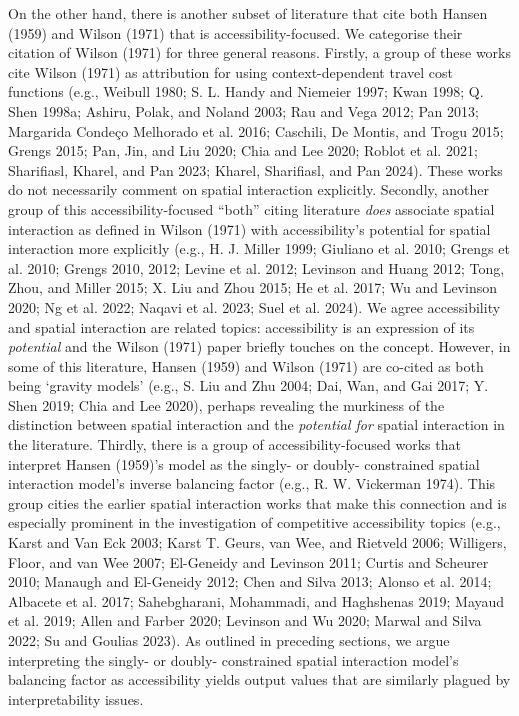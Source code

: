 \documentclass[
]{article}
\begin{document}
On the other hand, there is another subset of literature that cite both
Hansen (1959) and Wilson (1971) that is accessibility-focused. We
categorise their citation of Wilson (1971) for three general reasons.
Firstly, a group of these works cite Wilson (1971) as attribution for
using context-dependent travel cost functions (e.g., Weibull 1980; S. L.
Handy and Niemeier 1997; Kwan 1998; Q. Shen 1998a; Ashiru, Polak, and
Noland 2003; Rau and Vega 2012; Pan 2013; Margarida Condeço Melhorado et
al. 2016; Caschili, De Montis, and Trogu 2015; Grengs 2015; Pan, Jin,
and Liu 2020; Chia and Lee 2020; Roblot et al. 2021; Sharifiasl, Kharel,
and Pan 2023; Kharel, Sharifiasl, and Pan 2024). These works do not
necessarily comment on spatial interaction explicitly. Secondly, another
group of this accessibility-focused ``both'' citing literature
\emph{does} associate spatial interaction as defined in Wilson (1971)
with accessibility's potential for spatial interaction more explicitly
(e.g., H. J. Miller 1999; Giuliano et al. 2010; Grengs et al. 2010;
Grengs 2010, 2012; Levine et al. 2012; Levinson and Huang 2012; Tong,
Zhou, and Miller 2015; X. Liu and Zhou 2015; He et al. 2017; Wu and
Levinson 2020; Ng et al. 2022; Naqavi et al. 2023; Suel et al. 2024). We
agree accessibility and spatial interaction are related topics:
accessibility is an expression of its \emph{potential} and the Wilson
(1971) paper briefly touches on the concept. However, in some of this
literature, Hansen (1959) and Wilson (1971) are co-cited as both being
`gravity models' (e.g., S. Liu and Zhu 2004; Dai, Wan, and Gai 2017; Y.
Shen 2019; Chia and Lee 2020), perhaps revealing the murkiness of the
distinction between spatial interaction and the \emph{potential for}
spatial interaction in the literature. Thirdly, there is a group of
accessibility-focused works that interpret Hansen (1959)'s model as the
singly- or doubly- constrained spatial interaction model's inverse
balancing factor (e.g., R. W. Vickerman 1974). This group cities the
earlier spatial interaction works that make this connection and is
especially prominent in the investigation of competitive accessibility
topics (e.g., Karst and Van Eck 2003; Karst T. Geurs, van Wee, and
Rietveld 2006; Willigers, Floor, and van Wee 2007; El-Geneidy and
Levinson 2011; Curtis and Scheurer 2010; Manaugh and El-Geneidy 2012;
Chen and Silva 2013; Alonso et al. 2014; Albacete et al. 2017;
Sahebgharani, Mohammadi, and Haghshenas 2019; Mayaud et al. 2019; Allen
and Farber 2020; Levinson and Wu 2020; Marwal and Silva 2022; Su and
Goulias 2023). As outlined in preceding sections, we argue interpreting
the singly- or doubly- constrained spatial interaction model's balancing
factor as accessibility yields output values that are similarly plagued
by interpretability issues.
\end{document}
